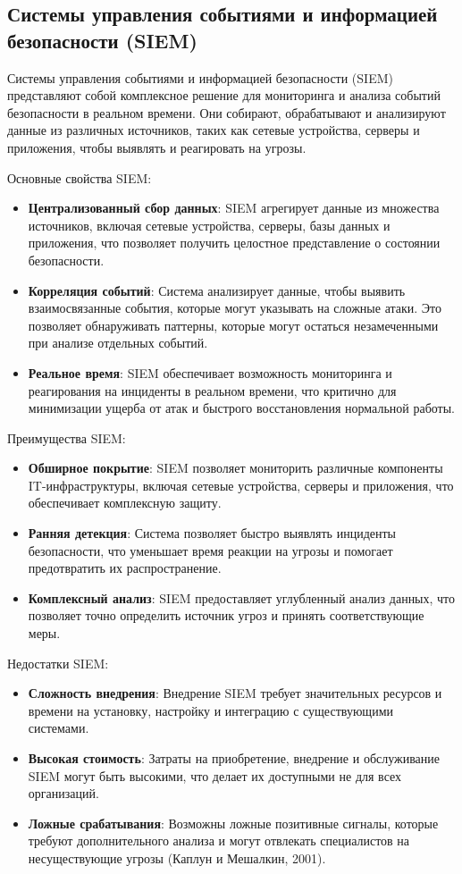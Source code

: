 \subsection{Системы управления событиями и информацией безопасности (SIEM)}

Системы управления событиями и информацией безопасности (SIEM) представляют собой комплексное решение для мониторинга и анализа событий безопасности в реальном времени. Они собирают, обрабатывают и анализируют данные из различных источников, таких как сетевые устройства, серверы и приложения, чтобы выявлять и реагировать на угрозы.

Основные свойства SIEM:
\begin{itemize}
    \item \textbf{Централизованный сбор данных}: SIEM агрегирует данные из множества источников, включая сетевые устройства, серверы, базы данных и приложения, что позволяет получить целостное представление о состоянии безопасности.
    \item \textbf{Корреляция событий}: Система анализирует данные, чтобы выявить взаимосвязанные события, которые могут указывать на сложные атаки. Это позволяет обнаруживать паттерны, которые могут остаться незамеченными при анализе отдельных событий.
    \item \textbf{Реальное время}: SIEM обеспечивает возможность мониторинга и реагирования на инциденты в реальном времени, что критично для минимизации ущерба от атак и быстрого восстановления нормальной работы.
\end{itemize}

Преимущества SIEM:
\begin{itemize}
    \item \textbf{Обширное покрытие}: SIEM позволяет мониторить различные компоненты IT-инфраструктуры, включая сетевые устройства, серверы и приложения, что обеспечивает комплексную защиту.
    \item \textbf{Ранняя детекция}: Система позволяет быстро выявлять инциденты безопасности, что уменьшает время реакции на угрозы и помогает предотвратить их распространение.
    \item \textbf{Комплексный анализ}: SIEM предоставляет углубленный анализ данных, что позволяет точно определить источник угроз и принять соответствующие меры.
\end{itemize}

Недостатки SIEM:
\begin{itemize}
    \item \textbf{Сложность внедрения}: Внедрение SIEM требует значительных ресурсов и времени на установку, настройку и интеграцию с существующими системами.
    \item \textbf{Высокая стоимость}: Затраты на приобретение, внедрение и обслуживание SIEM могут быть высокими, что делает их доступными не для всех организаций.
    \item \textbf{Ложные срабатывания}: Возможны ложные позитивные сигналы, которые требуют дополнительного анализа и могут отвлекать специалистов на несуществующие угрозы (Каплун и Мешалкин, 2001).
\end{itemize}


